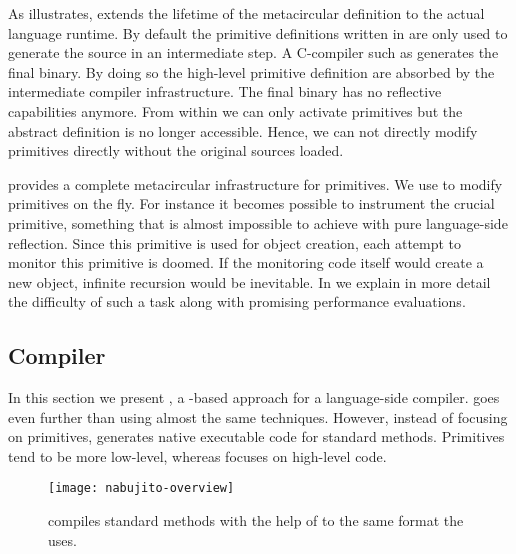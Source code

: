 As  illustrates, \WF extends the lifetime of the metacircular \VM definition to the actual language runtime.
By default the primitive definitions written in \Slang are only used to generate the \VM source in an intermediate step.
A C-compiler such as \GCC generates the final binary.
By doing so the high-level primitive definition are absorbed by the intermediate compiler infrastructure.
The final binary has no reflective capabilities anymore.
From within \PH we can only activate primitives but the abstract definition is no longer accessible.
Hence, we can not directly modify primitives directly without the original \VM sources loaded.

\WF provides a complete metacircular infrastructure for primitives.
We use \WF to modify primitives on the fly.
For instance it becomes possible to instrument the crucial  primitive, something that is almost impossible to achieve with pure language-side reflection.
Since this primitive is used for object creation, each attempt to monitor this primitive is doomed.
If the monitoring code itself would create a new object, infinite recursion would be inevitable.
In  we explain in more detail the difficulty of such a task along with promising performance evaluations.



\subsection{\NBJ \JIT Compiler}
In this section we present \NBJ, a \B-based approach for a language-side \JIT compiler.
\NBJ goes even further than \WF using almost the same techniques.
However, instead of focusing on primitives, \NBJ generates native executable code for standard \PH methods.
Primitives tend to be more low-level, whereas \NBJ focuses on high-level \PH code. 

\begin{figure}[h]
	\centering
	\texttt{[image: nabujito-overview]}
	\caption[\NBJ Overview]{\NBJ compiles standard \PH methods with the help of \B to the same format the \VM \JIT uses.}
\end{figure}

